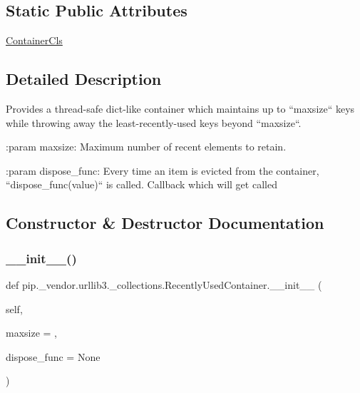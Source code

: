\subsection*{Static Public Attributes}
\begin{DoxyCompactItemize}
\item 
\hyperlink{classpip_1_1__vendor_1_1urllib3_1_1__collections_1_1RecentlyUsedContainer_a8b21aa274ddd0bea802addb8387ccc86}{Container\+Cls}
\end{DoxyCompactItemize}


\subsection{Detailed Description}
\begin{DoxyVerb}Provides a thread-safe dict-like container which maintains up to
``maxsize`` keys while throwing away the least-recently-used keys beyond
``maxsize``.

:param maxsize:
    Maximum number of recent elements to retain.

:param dispose_func:
    Every time an item is evicted from the container,
    ``dispose_func(value)`` is called.  Callback which will get called
\end{DoxyVerb}
 

\subsection{Constructor \& Destructor Documentation}
\mbox{\label{classpip_1_1__vendor_1_1urllib3_1_1__collections_1_1RecentlyUsedContainer_a78753b96981aa1d67e4de46545a15e9d}} 
\subsubsection{\texorpdfstring{\+\_\+\+\_\+init\+\_\+\+\_\+()}{\_\_init\_\_()}}
{\footnotesize\ttfamily def pip.\+\_\+vendor.\+urllib3.\+\_\+collections.\+Recently\+Used\+Container.\+\_\+\+\_\+init\+\_\+\+\_\+ (\begin{DoxyParamCaption}\item[{}]{self,  }\item[{}]{maxsize = {},  }\item[{}]{dispose\+\_\+func = {\ttfamily None} }\end{DoxyParamCaption})}



